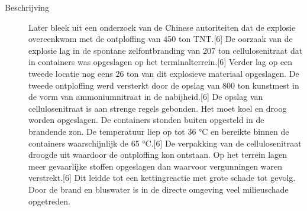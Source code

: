 \begin{description}
\item[Beschrijving]

Later bleek uit een onderzoek van de Chinese autoriteiten dat de explosie overeenkwam met de ontploffing van 450 ton TNT.[6] 
De oorzaak van de explosie lag in de spontane zelfontbranding van 207 ton cellulosenitraat dat in containers was opgeslagen op het terminalterrein.[6] 
Verder lag op een tweede locatie nog eens 26 ton van dit explosieve materiaal opgeslagen.
De tweede ontploffing werd versterkt door de opslag van 800 ton kunstmest in de vorm van ammoniumnitraat in de nabijheid.[6]
De opslag van cellulosenitraat is aan strenge regels gebonden. Het moet koel en droog worden opgeslagen. De containers stonden buiten opgesteld in de brandende zon. De temperatuur liep op tot 36 °C en bereikte binnen de containers waarschijnlijk de 65 °C.[6] De verpakking van de cellulosenitraat droogde uit waardoor de ontploffing kon ontstaan. Op het terrein lagen meer gevaarlijke stoffen opgeslagen dan waarvoor vergunningen waren verstrekt.[6] Dit leidde tot een kettingreactie met grote schade tot gevolg. Door de brand en bluswater is in de directe omgeving veel milieuschade opgetreden.



\end{description}
